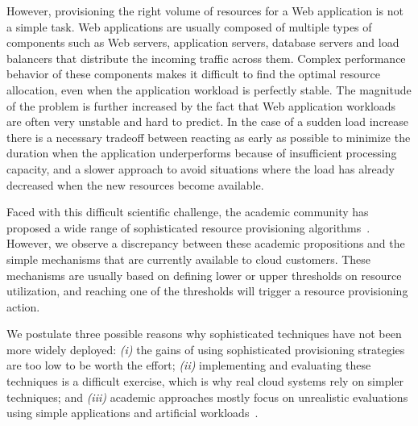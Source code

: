 However, provisioning the right volume of resources for a Web
application is not a simple task. Web applications are usually
composed of multiple types of components such as Web
servers, application servers, database servers and load balancers that distribute the incoming traffic across them. Complex performance
behavior of these components makes it difficult to find the optimal
resource allocation, even when the application workload is perfectly
stable. The magnitude of the problem is further increased by the fact
that Web application workloads are often very unstable and hard to
predict. In the case of a sudden load increase there is a necessary
tradeoff between reacting as early as possible to minimize the
duration when the application underperforms because of insufficient
processing capacity, and a slower approach to avoid situations where
the load has already decreased when the new resources become
available.

Faced with this difficult scientific challenge, the academic community
has proposed a wide range of sophisticated resource provisioning
algorithms~\cite{muppala_regression-based_2012, urgaonkar_agile_2008,vasic_dejavu:_2012}. 
However, we observe a discrepancy between these academic propositions
and the simple mechanisms that are currently available to  
cloud customers. These mechanisms are usually based on defining 
lower or upper thresholds on resource utilization, and reaching one of the
thresholds will trigger a resource provisioning action. 

We postulate three possible reasons why sophisticated
techniques have not been more widely deployed: \emph{(i)} the gains of
using sophisticated provisioning strategies are too low to be worth
the effort; \emph{(ii)} implementing and evaluating these techniques is a difficult
exercise, which is why real cloud systems rely on simpler techniques;
and \emph{(iii)} academic approaches mostly focus on unrealistic
evaluations using simple applications and artificial
workloads~\cite{do_profiling_2011, islam_empirical_2012}. %

